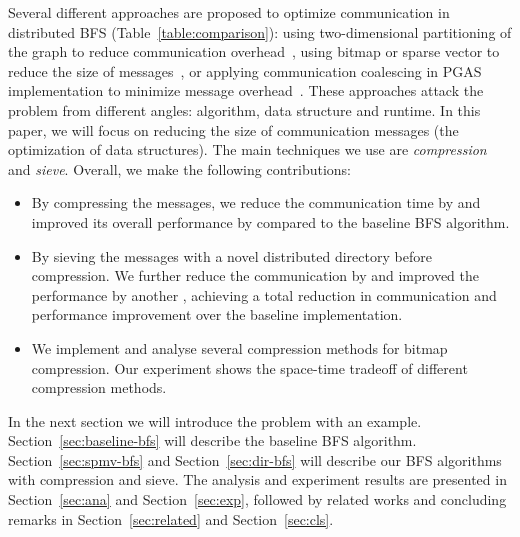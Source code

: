 \documentclass[conference]{IEEEtran}
\begin{document}
Several different approaches are proposed to optimize communication in
distributed BFS (Table~\ref{table:comparison}): using two-dimensional
partitioning of the graph to reduce communication
overhead~\cite{Yoo:2005,Buluc:2011}, using bitmap or sparse vector to reduce
the size of messages~\cite{graph500,Buluc:2011}, or applying communication
coalescing in PGAS implementation to minimize message
overhead~\cite{Cong:2010}. These approaches attack the problem from different
angles: algorithm, data structure and runtime. In this paper, we will focus on
reducing the size of communication messages (the optimization of data
structures).  The main techniques we use are \emph{compression} and
\emph{sieve}. Overall, we make the following contributions:
\begin{itemize}
\item By compressing the messages, we reduce the communication time by 
  and improved its overall performance by  compared to the baseline BFS
  algorithm. 
\item By sieving the messages with a novel distributed directory before
  compression. We further reduce the communication by  and improved the
  performance by another , achieving a total  reduction in
  communication and  performance improvement over the baseline
  implementation. 
\item We implement and analyse several compression methods for bitmap
  compression. Our experiment shows the space-time tradeoff of different
  compression methods. 
\end{itemize}

In the next section we will introduce the problem with an
example. Section~\ref{sec:baseline-bfs} will describe the baseline BFS
algorithm. Section~\ref{sec:spmv-bfs} and Section~\ref{sec:dir-bfs} will
describe our BFS algorithms with compression and sieve. The analysis and
experiment results are presented in Section~\ref{sec:ana} and
Section~\ref{sec:exp}, followed by related works and concluding remarks in
Section~\ref{sec:related} and Section~\ref{sec:cls}.
\end{document}
